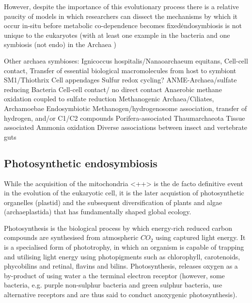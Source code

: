 However, despite the importance of this evolutionary process there is a relative
paucity of models in which researchers can dissect the mechanisms by which it occur
in-situ before metabolic co-dependence becomes fixed\.







endosymbiosis is not unique to the eukaryotes (with at least one example in the
bacteria \citep{vonDohlen2001} and one symbiosis (not endo) in the Archaea \citep{Huber2002})

Other archaea symbioses:
Ignicoccus hospitalis/Nanaoarchaeum equitans, Cell-cell contact, Transfer of essential biological macromolecules from host to symbiont
SM1/Thiothrix   Cell appendages Sulfur redox cycling?
ANME-Archaea/sulfate reducing Bacteria  Cell-cell contact/ no direct contact    Anaerobic methane oxidation coupled to sulfate reduction
Methanogenic Archaea/Ciliates, Archamoebae   Endosymbiotic   Methanogen/hydrogenosome association, transfer of hydrogen, and/or C1/C2 compounds
Porifera-associated Thaumarchaeota  Tissue associated   Ammonia oxidation
Diverse associations between insect and vertebrate guts
\citep{Wrede2012}





\subsection{Photosynthetic endosymbiosis}

While the acquisition of the mitochondria <++> %
is the de facto definitive event in the evolution of the eukaryotic cell, 
it is the later acquistion of photosynthetic organelles (plastid) and the subsequent 
diversification of plants and algae (archaeplastida) that has fundamentally shaped global ecology.

Photosynthesis is the biological process by which energy-rich reduced carbon compounds 
are synthesised from atmospheric \(CO_{2}\) using captured light energy. 
It is a specialised form of phototrophy, in which an organism is capable of trapping
and utilising light energy using photopigments such as chlorophyll, carotenoids, phycobilins
and retinal, flavins and bilins. 
Photosynthesis, releases oxygen as a by-product of using water a the terminal electron receptor 
(however, some bacteria, e.g. purple non-sulphur bacteria and green sulphur bacteria, use alternative
receptors and are thus said to conduct anoxygenic photosynthesis).


